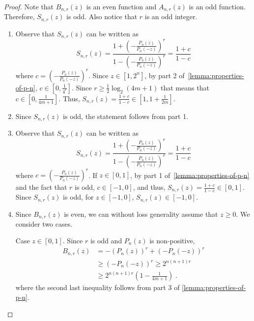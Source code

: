 \begin{proof}
Note that $B_{n,r}(z)$ is an even function and $A_{n,r}(z)$ is an odd function.
Therefore, $S_{n,r}(z)$ is odd. Also notice that $r$ is an odd integer.

\begin{enumerate}
\item Observe that $S_{n,r}(z)$ can be written as
$$
S_{n,r}(z) = \frac{\displaystyle 1 + \left( - \frac{P_n(z)}{P_n(-z)}\right)^r}{\displaystyle 1 - \left( - \frac{P_n(z)}{P_n(-z)}\right)^r} = \frac{1 + c}{1 - c}
$$
where $c = \left( - \frac{P_n(z)}{P_n(-z)}\right)^r$. Since $z \in [1,2^n]$, by
part 2 of~\autoref{lemma:properties-of-p-n}, $c \in [0,\frac{1}{4^r}]$. Since
$r \ge \frac{1}{2} \log_2(4m+1)$ that means that $c \in [0,\frac{1}{4m+1}]$. Thus,
$S_{n,r}(z) = \frac{1+c}{1-c} \in [1,1 + \frac{1}{2m}]$.

\item Since $S_{n,r}(z)$ is odd, the statement follows from part 1.

\item Observe that $S_{n,r}(z)$ can be written as
$$
S_{n,r}(z) = \frac{\displaystyle 1 + \left( - \frac{P_n(z)}{P_n(-z)}\right)^r}{\displaystyle 1 - \left( - \frac{P_n(z)}{P_n(-z)}\right)^r} = \frac{1 + c}{1 - c}
$$
where $c = \left( - \frac{P_n(z)}{P_n(-z)}\right)^r$. If $z \in [0,1]$, by part
1 of~\autoref{lemma:properties-of-p-n} and the fact that $r$ is odd, $c
\in [-1,0]$, and thus, $S_{n,r}(z) = \frac{1+c}{1-c} \in [0,1]$. Since
$S_{n,r}(z)$ is odd, for $z \in [-1,0]$, $S_{n,r}(z) \in [-1,0]$.

\item Since $B_{n,r}(z)$ is even, we can without loss generality assume that $z \ge
0$. We consider two cases.

Case $z \in [0,1]$. Since $r$ is odd and $P_n(z)$ is non-positive,
\begin{align*}
B_{n,r}(z)
& = - (P_n(z))^r + \left(- P_{n}(-z)\right)^r \\
& \ge \left(- P_{n}(-z)\right)^r \ge 2^{n(n+1)r}  \\
& \ge 2^{n(n+1)r} \left( 1 - \frac{1}{4m+1} \right) \; .
\end{align*}
where the second last inequality follows from part 3 of \autoref{lemma:properties-of-p-n}.


\end{enumerate}
\end{proof}
